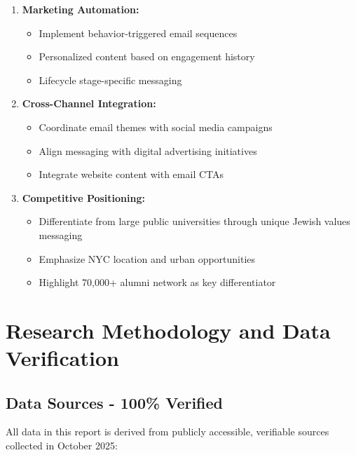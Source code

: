 \documentclass[12pt,letterpaper]{article}
\begin{document}
\begin{enumerate}[leftmargin=*]
    \item \textbf{Marketing Automation:}
    \begin{itemize}
        \item Implement behavior-triggered email sequences
        \item Personalized content based on engagement history
        \item Lifecycle stage-specific messaging
    \end{itemize}

    \item \textbf{Cross-Channel Integration:}
    \begin{itemize}
        \item Coordinate email themes with social media campaigns
        \item Align messaging with digital advertising initiatives
        \item Integrate website content with email CTAs
    \end{itemize}

    \item \textbf{Competitive Positioning:}
    \begin{itemize}
        \item Differentiate from large public universities through unique Jewish values messaging
        \item Emphasize NYC location and urban opportunities
        \item Highlight 70,000+ alumni network as key differentiator
    \end{itemize}
\end{enumerate}

\section{Research Methodology and Data Verification}

\subsection{Data Sources - 100\% Verified}

All data in this report is derived from publicly accessible, verifiable sources collected in October 2025:
\end{document}
